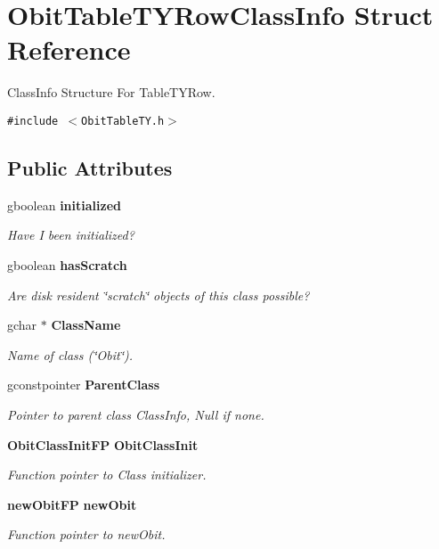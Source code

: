 \section{Obit\-Table\-TYRow\-Class\-Info Struct Reference}
\label{structObitTableTYRowClassInfo}
Class\-Info Structure For Table\-TYRow.  


{\tt \#include $<$Obit\-Table\-TY.h$>$}

\subsection*{Public Attributes}
\begin{CompactItemize}
\item 
gboolean {\bf initialized}
\begin{CompactList}\small\item\em Have I been initialized? \item\end{CompactList}\item 
gboolean {\bf has\-Scratch}
\begin{CompactList}\small\item\em Are disk resident \char`\"{}scratch\char`\"{} objects of this class possible? \item\end{CompactList}\item 
gchar $\ast$ {\bf Class\-Name}
\begin{CompactList}\small\item\em Name of class (\char`\"{}Obit\char`\"{}). \item\end{CompactList}\item 
gconstpointer {\bf Parent\-Class}
\begin{CompactList}\small\item\em Pointer to parent class Class\-Info, Null if none. \item\end{CompactList}\item 
{\bf Obit\-Class\-Init\-FP} {\bf Obit\-Class\-Init}
\begin{CompactList}\small\item\em Function pointer to Class initializer. \item\end{CompactList}\item 
{\bf new\-Obit\-FP} {\bf new\-Obit}
\begin{CompactList}\small\item\em Function pointer to new\-Obit. \item\end{CompactList}\item 

\end{CompactItemize}
